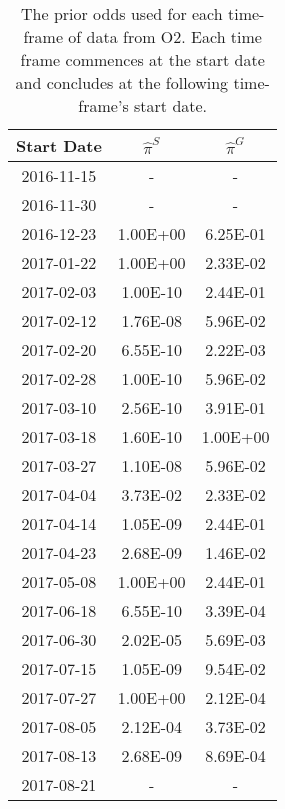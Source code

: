 \begin{table}
\centering
\caption{The prior odds used for each time-frame of data from O2. Each time frame commences at the start date and concludes at the following time-frame's start date.
    }
\label{tab:priorodds}
\def\arraystretch{1.5} 
\setlength{\tabcolsep}{0.5em}
\begin{tabular}{c|cc}

 Start Date &    $\hat{\pi}^S$ &    $\hat{\pi}^G$ \\
\midrule
 2016-11-15 &        - &        - \\
 2016-11-30 &        - &        - \\
 2016-12-23 & 1.00E+00 & 6.25E-01 \\
 2017-01-22 & 1.00E+00 & 2.33E-02 \\
 2017-02-03 & 1.00E-10 & 2.44E-01 \\
 2017-02-12 & 1.76E-08 & 5.96E-02 \\
 2017-02-20 & 6.55E-10 & 2.22E-03 \\
 2017-02-28 & 1.00E-10 & 5.96E-02 \\
 2017-03-10 & 2.56E-10 & 3.91E-01 \\
 2017-03-18 & 1.60E-10 & 1.00E+00 \\
 2017-03-27 & 1.10E-08 & 5.96E-02 \\
 2017-04-04 & 3.73E-02 & 2.33E-02 \\
 2017-04-14 & 1.05E-09 & 2.44E-01 \\
 2017-04-23 & 2.68E-09 & 1.46E-02 \\
 2017-05-08 & 1.00E+00 & 2.44E-01 \\
 2017-06-18 & 6.55E-10 & 3.39E-04 \\
 2017-06-30 & 2.02E-05 & 5.69E-03 \\
 2017-07-15 & 1.05E-09 & 9.54E-02 \\
 2017-07-27 & 1.00E+00 & 2.12E-04 \\
 2017-08-05 & 2.12E-04 & 3.73E-02 \\
 2017-08-13 & 2.68E-09 & 8.69E-04 \\
 2017-08-21 &        - &        - \\

\end{tabular}
\end{table}
